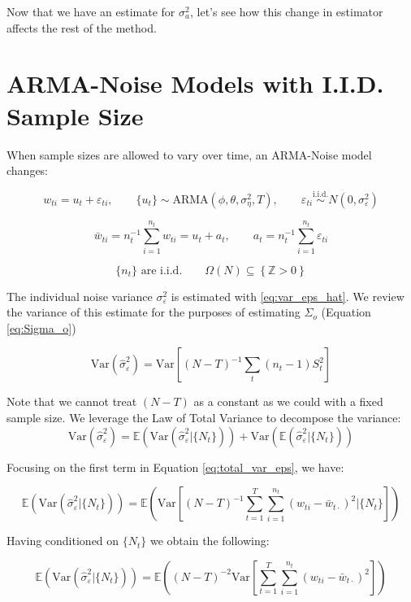 \documentclass{TUT}
\numberwithin{equation}{section}
\theoremstyle{plain}
\begin{document}
Now that we have an estimate for $\sigma_a^2$, let's see how this change in estimator affects the rest of the method.

\section{ARMA-Noise Models with I.I.D. Sample Size}


When sample sizes are allowed to vary over time, an ARMA-Noise model changes:

$$ w_{ti} = u_t + \varepsilon_{ti}, \qquad \{u_t\} \sim \text{ARMA}(\phi,\theta,\sigma_\eta^2,T), \qquad \varepsilon_{ti}\overset{\text{i.i.d.}}{\sim}N(0,\sigma_\varepsilon^2)$$

$$ \bar{w}_{ti} = n_t^{-1}\sum_{i = 1}^{n_t}w_{ti} =  u_t + a_t, \qquad a_t = n_t^{-1}\sum_{i=1}^{n_t}\varepsilon_{ti}$$

$$ \{n_t\} \text{ are i.i.d.} \qquad \Omega(N) \subseteq \left\{\mathbb{Z}>0\right\} $$

The individual noise variance $\sigma_\varepsilon^2$ is estimated with \ref{eq:var_eps_hat}. We review the variance of this estimate for the purposes of estimating $\Sigma_o$ (Equation \ref{eq:Sigma_o}) 

$$ \text{Var}(\hat{\sigma}_\varepsilon^2) = \text{Var}\left[(N-T)^{-1}\sum_{t}(n_t-1)S_t^2\right] $$

Note that we cannot treat $(N-T)$ as a constant as we could with a fixed sample size. We leverage the Law of Total Variance to decompose the variance:
\begin{equation}
    \text{Var} (\hat{\sigma}_\varepsilon^2) = \mathbb{E}(\text{Var}(\hat{\sigma}_\varepsilon^2|\{N_t\})) + \text{Var}(\mathbb{E}(\hat{\sigma}_\varepsilon^2|\{N_t\})) 
    \label{eq:total_var_eps}
\end{equation}


Focusing on the first term in Equation \ref{eq:total_var_eps}, we have: 

$$ \mathbb{E}(\text{Var}(\hat{\sigma}_\varepsilon^2|\{N_t\})) = \mathbb{E}\left(\text{Var}\left[(N-T)^{-1}\sum_{t=1}^T\sum_{i=1}^{n_t}(w_{ti}-\bar{w}_{t\cdot})^2|\{N_t\}\right]\right) $$

Having conditioned on $\{N_t\}$ we obtain the following:

$$ \mathbb{E}(\text{Var}(\hat{\sigma}_\varepsilon^2|\{N_t\})) = \mathbb{E}\left((N-T)^{-2}\text{Var}\left[\sum_{t=1}^T\sum_{i=1}^{n_t}(w_{ti}-\bar{w}_{t\cdot})^2\right]\right) $$
\end{document}

